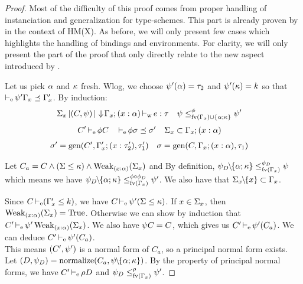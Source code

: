 \begin{proof}
  Most of the difficulty of this proof comes from proper handling of
  instanciation and generalization for type-schemes.
  This part is already proven
  by \citet{sulzmann1997proofs} in the context
  of HM(X). As before, we will only present few cases
  which highlights the handling of bindings and environments.
  For clarity, we will only present the part of the proof that
  only directly relate to the new aspect introduced by \lang.
  \\





  Let us pick $\alpha$ and $\kappa$ fresh.
  Wlog, we choose $\mathrm{\psi}'(\alpha) = \tau_2$ and $\mathrm{\psi}'(\kappa) = k$
  so that $\operatorname{\vdash_e} \mathrm{\psi}'\Gamma_x \preceq \Gamma'_x$.
  By induction:
  \begin{align*}
    \Sigma_x \operatorname{|} (C,\mathrm{\psi}) \operatorname{|} \Downarrow\!\Gamma_x;(x : \alpha)& \operatorname{\vdash_w} e : \tau
    &\mathrm{\psi} &\leq^{\phi}_{\operatorname{fv}(\Gamma_x)\cup\{\alpha;\kappa\}} \mathrm{\psi}'
  \end{align*}
  \begin{align*}
    C'& \operatorname{\vdash_e} \phi C
    && \operatorname{\vdash_e} \phi \sigma \preceq \sigma'
    &\Sigma_x&\subset\Gamma_x;(x : \alpha)
  \end{align*}
  \begin{align*}
    \sigma' &= \operatorname{\text{gen}}(C',\Gamma_x';(x : \tau'_2),\tau'_1)
    &\sigma &= \operatorname{\text{gen}}(C,\Gamma_x;(x : \alpha),\tau_1)
  \end{align*}

  Let $C_a = C\wedge (\Sigma \leq \kappa) \wedge \operatorname{Weak}_{(x : \alpha)}(\Sigma_x)$
  and
  By definition, $\mathrm{\psi}_D\!\!\mathbin{\setminus}\!\!\{\alpha;\kappa\} \leq^{\phi_D}_{\operatorname{fv}(\Gamma_x)} \mathrm{\psi}$
  which means we have
  $\mathrm{\psi}_D\!\!\mathbin{\setminus}\!\!\{\alpha;\kappa\} \leq^{\phi\circ\phi_D}_{\operatorname{fv}(\Gamma_x)} \mathrm{\psi}'$.
  We also have that $\Sigma_x\!\!\mathbin{\setminus}\!\!\{x\}\subset \Gamma_x$.

  Since $C \operatorname{\vdash_e} (\Gamma'_x \leq k)$, we have $C \operatorname{\vdash_e} \mathrm{\psi}'(\Sigma \leq \kappa)$.
  If $x\in\Sigma_x$, then $\operatorname{Weak}_{(x : \alpha)}(\Sigma_x) = \operatorname{True}$.
  Otherwise we can show by induction
  that $C' \operatorname{\vdash_e} \mathrm{\psi}'\operatorname{Weak}_{(x : \alpha)}(\Sigma_x)$.
  We also have $\mathrm{\psi} C = C$, which gives us $C' \operatorname{\vdash_e} \mathrm{\psi}'(C_a)$.
  We can deduce
  $C' \operatorname{\vdash_e} \mathrm{\psi}'(C_a)$.\\
  This means $(C',\mathrm{\psi}')$ is a normal form of $C_a$, so a principal normal form
  exists. Let $(D,\mathrm{\psi}_D) = \operatorname{normalize}(C_a,\mathrm{\psi}\!\!\mathbin{\setminus}\!\!\{\alpha;\kappa\})$.
  By the property of principal normal forms,
  we have $C' \operatorname{\vdash_e} \rho D$ and
  $\mathrm{\psi}_D \leq^{\rho}_{\operatorname{fv}(\Gamma_x)} \mathrm{\psi}'$.


\end{proof}
